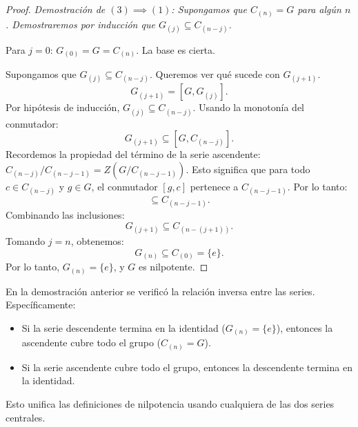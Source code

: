 \begin{proof}
    \itshape Demostración de $(3) \implies (1)$: \normalfont
    Supongamos que $C_{(n)} = G$ para algún $n$.
    Demostraremos por inducción que $G_{(j)} \subseteq C_{(n-j)}$.
    
    Para $j=0$: $G_{(0)} = G = C_{(n)}$. La base es cierta.
    
    Supongamos que $G_{(j)} \subseteq C_{(n-j)}$. Queremos ver qué sucede con $G_{(j+1)}$.
    \begin{equation*}
        G_{(j+1)} = [G, G_{(j)}].
    \end{equation*}
    Por hipótesis de inducción, $G_{(j)} \subseteq C_{(n-j)}$. Usando la monotonía del conmutador:
    \begin{equation*}
        G_{(j+1)} \subseteq [G, C_{(n-j)}].
    \end{equation*}
    Recordemos la propiedad del término de la serie ascendente: $C_{(n-j)}/C_{(n-j-1)} = Z(G/C_{(n-j-1)})$.
    Esto significa que para todo $c \in C_{(n-j)}$ y $g \in G$, el conmutador $[g, c]$ pertenece a $C_{(n-j-1)}$.
    Por lo tanto:
    \begin{equation*}
        [G, C_{(n-j)}] \subseteq C_{(n-j-1)}.
    \end{equation*}
    Combinando las inclusiones:
    \begin{equation*}
        G_{(j+1)} \subseteq C_{(n-(j+1))}.
    \end{equation*}
    Tomando $j=n$, obtenemos:
    \begin{equation*}
        G_{(n)} \subseteq C_{(0)} = \{e\}.
    \end{equation*}
    Por lo tanto, $G_{(n)} = \{e\}$, y $G$ es nilpotente.
\end{proof}

 En la demostración anterior se verificó la relación inversa entre las series. Específicamente:
    \begin{itemize}
        \item Si la serie descendente termina en la identidad ($G_{(n)}=\{e\}$), entonces la ascendente cubre todo el grupo ($C_{(n)}=G$).
        \item Si la serie ascendente cubre todo el grupo, entonces la descendente termina en la identidad.
    \end{itemize}
    Esto unifica las definiciones de nilpotencia usando cualquiera de las dos series centrales.
